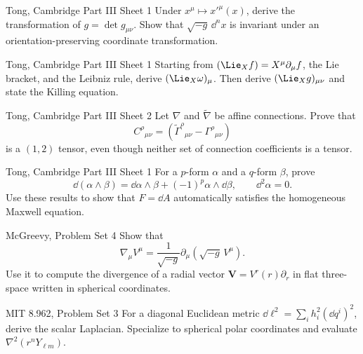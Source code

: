 \begin{exercises}

\begin{exercise}{Tong, Cambridge Part III Sheet 1}
Under \(x^\mu\mapsto x'^\mu(x)\), derive the transformation of
\(g=\det g_{\mu\nu}\).  Show that \(\sqrt{-g}\,\dd^nx\) is invariant under an
orientation-preserving coordinate transformation.
\end{exercise}

\begin{exercise}{Tong, Cambridge Part III Sheet 1}
Starting from \((\Lie_Xf)=X^\mu\partial_\mu f\), the Lie bracket, and the
Leibniz rule, derive \((\Lie_X\omega)_\mu\).  Then derive
\((\Lie_Xg)_{\mu\nu}\) and state the Killing equation.
\end{exercise}

\begin{exercise}{Tong, Cambridge Part III Sheet 2}
Let \(\nabla\) and \(\widetilde\nabla\) be affine connections.  Prove that
\[
C^\rho{}_{\mu\nu}
=(\widetilde\Gamma^\rho{}_{\mu\nu}-\Gamma^\rho{}_{\mu\nu})
\]
is a \((1,2)\) tensor, even though neither set of connection coefficients is a
tensor.
\end{exercise}

\begin{exercise}{Tong, Cambridge Part III Sheet 1}
For a \(p\)-form \(\alpha\) and a \(q\)-form \(\beta\), prove
\[
\dd(\alpha\wedge\beta)
=\dd\alpha\wedge\beta+(-1)^p\alpha\wedge\dd\beta,
\qquad \dd^2\alpha=0.
\]
Use these results to show that \(F=\dd A\) automatically satisfies the
homogeneous Maxwell equation.
\end{exercise}

\begin{exercise}{McGreevy, Problem Set 4}
Show that
\[
\nabla_\mu V^\mu=\frac1{\sqrt{-g}}
\partial_\mu(\sqrt{-g}\,V^\mu).
\]
Use it to compute the divergence of a radial vector
\(\bm V=V^r(r)\partial_r\) in flat three-space written in spherical
coordinates.
\end{exercise}

\begin{exercise}{MIT 8.962, Problem Set 3}
For a diagonal Euclidean metric
\(\dd\ell^2=\sum_i h_i^2(\dd q^i)^2\), derive the scalar Laplacian.  Specialize
to spherical polar coordinates and evaluate \(\nabla^2(r^nY_{\ell m})\).
\end{exercise}


\end{exercises}

